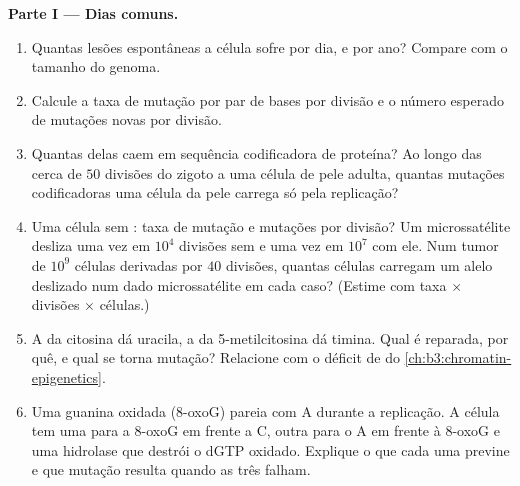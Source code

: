 \begin{problem}
\medskip
\noindent\textbf{Parte I --- Dias comuns.}
\begin{enumerate}
  \item Quantas lesões espontâneas a célula sofre por dia, e por ano?
        Compare com o tamanho do genoma.
  \item Calcule a taxa de mutação por par de bases por divisão e o
        número esperado de mutações novas por divisão.
  \item Quantas delas caem em sequência codificadora de proteína? Ao
        longo das cerca de $50$ divisões do zigoto a uma célula de
        pele adulta, quantas mutações codificadoras uma célula da pele
        carrega só pela replicação?
  \item Uma célula sem : taxa de mutação e
        mutações por divisão? Um microssatélite desliza uma vez em
        $10^{4}$ divisões sem  e uma vez em
        $10^{7}$ com ele. Num tumor de $10^{9}$ células derivadas por
        $40$ divisões, quantas células carregam um alelo deslizado num
        dado microssatélite em cada caso? (Estime com taxa $\times$
        divisões $\times$ células.)
  \item A  da citosina dá uracila, a da 5-metilcitosina dá
        timina. Qual é reparada, por quê, e qual se torna mutação?
        Relacione com o déficit de  do
        \cref{ch:b3:chromatin-epigenetics}.
  \item Uma guanina oxidada (8-oxoG) pareia com A durante a
        replicação. A célula tem uma  para a 8-oxoG em
        frente a C, outra para o A em frente à 8-oxoG e uma hidrolase
        que destrói o dGTP oxidado. Explique o que cada uma previne e
        que mutação resulta quando as três falham.
\end{enumerate}


\end{problem}
